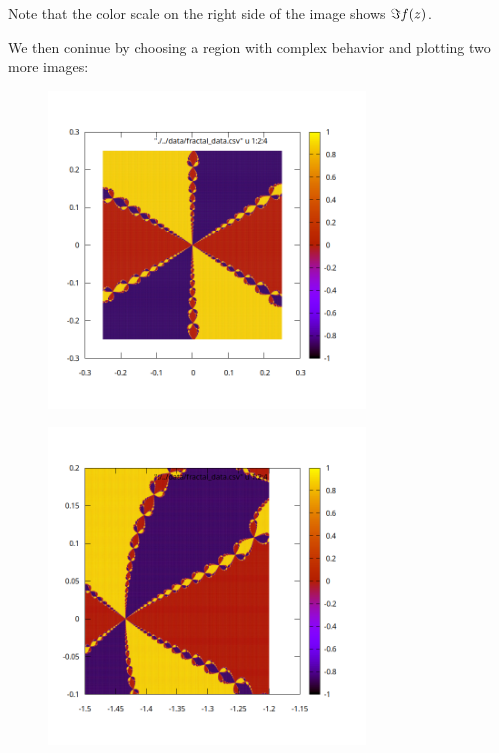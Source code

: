 \documentclass[12pt]{article}
\DeclarePairedDelimiter\rb{(}{)}
\begin{document}
Note that the color scale on the right side of the image shows \(\Im f\rb*{z}\).

We then coninue by choosing a region with complex behavior and plotting two more images:

     \begin{figure}[ht]
    \centering
    \includegraphics[width=0.75\textwidth]{./../problem04/plots/fractal_plot-02_02.png}
    \label{fig:02_02}
\end{figure}

     \begin{figure}[ht]
    \centering
    \includegraphics[width=0.75\textwidth]{./../problem04/plots/fractal_plot-02_03.png}
    \label{fig:02_03}
\end{figure}
\end{document}
